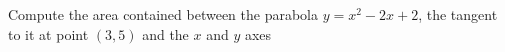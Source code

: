
%
%
%
%
% 
% 

\question Compute the area contained between the parabola $y=x^2-2x+2$, the
tangent to it at point $(3,5)$ and the $x$ and $y$ axes

\insertQR{}

